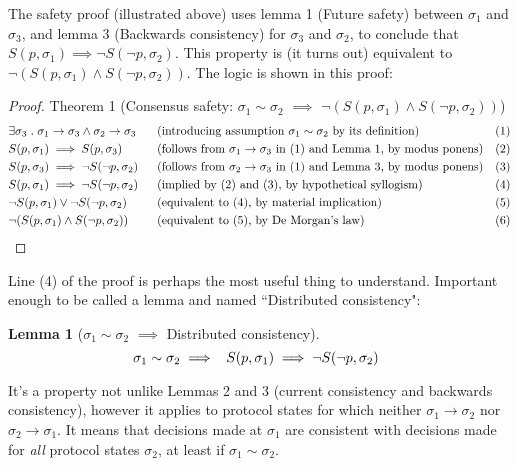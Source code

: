 \documentclass{article}
\theoremstyle{definition}
\newtheorem{lemma}{Lemma}
\begin{document}
The safety proof (illustrated above) uses lemma 1 (Future safety) between $\sigma_1$ and $\sigma_3$, and lemma 3 (Backwards consistency) for $\sigma_3$ and $\sigma_2$, to conclude that $S(p,\sigma_1) \implies \neg{S(\neg{p},\sigma_2)}$. This property is (it turns out) equivalent to $\neg{(S(p,\sigma_1)\land S(\neg{p},\sigma_2))}$. The logic is shown in this proof:


\begin{proof}
Theorem 1 (Consensus safety: $\sigma_1 \sim \sigma_2$ $\implies$ $\neg(S(p,\sigma_1) \land S(\neg{p},\sigma_2))$)
\begin{align*}
  &\exists \sigma_3 \hspace{1mm} . \hspace{1mm} \sigma_1 \to \sigma_3 \land \sigma_2 \to \sigma_3 &&\text{(introducing assumption $\sigma_1 \sim \sigma_2$ by its definition)} &&\text{(1)} \\
  &S(p,\sigma_1) \implies S(p,\sigma_3) &&\text{(follows from $\sigma_1 \to \sigma_3$ in (1) and Lemma 1, by modus ponens)} &&\text{(2)} \\
  &S(p,\sigma_3) \implies \neg{S(\neg{p},\sigma_2)} &&\text{(follows from $\sigma_2 \to \sigma_3$ in (1) and Lemma 3, by modus ponens)} &&\text{(3)} \\
  &S(p,\sigma_1) \implies \neg{S(\neg{p},\sigma_2)} &&\text{(implied by (2) and (3), by hypothetical syllogism)} &&\text{(4)} \\
  &\neg{S(p,\sigma_1)} \lor \neg{S(\neg{p},\sigma_2)} &&\text{(equivalent to (4), by material implication)} &&\text{(5)} \\
  &\neg(S(p,\sigma_1) \land S(\neg{p},\sigma_2)) \hspace{5mm} \qedhere &&\text{(equivalent to (5), by De Morgan's law)}&&\text{(6)}
\end{align*}
\end{proof}

Line (4) of the proof is perhaps the most useful thing to understand. Important enough to be called a lemma and named ``Distributed consistency":
 
\begin{lemma}[$\sigma_1 \sim \sigma_2$ $\implies$ Distributed consistency]
$$
\sigma_1 \sim \sigma_2 \implies \hspace{2mm} S(p,\sigma_1) \implies \neg{S(\neg{p},\sigma_2)} \hspace{2mm}
$$
\end{lemma}

It's a property not unlike Lemmas 2 and 3 (current consistency and backwards consistency), however it applies to protocol states for which neither $\sigma_1 \to \sigma_2$ nor $\sigma_2 \to \sigma_1$. It means that decisions made at $\sigma_1$ are consistent with decisions made for \emph{all} protocol states $\sigma_2$, at least if $\sigma_1 \sim \sigma_2$.
\end{document}
